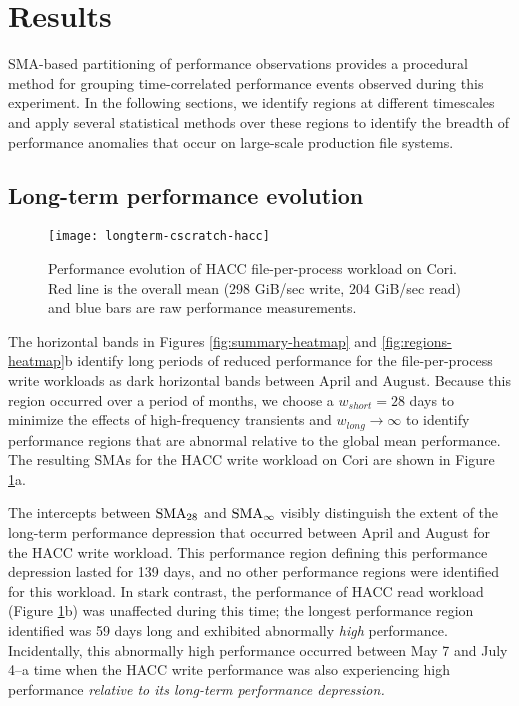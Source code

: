 \section{Results}\label{sec:results}

SMA-based partitioning of performance observations provides a procedural method for grouping time-correlated performance events observed during this experiment.
In the following sections, we identify regions at different timescales and apply several statistical methods over these regions to identify the breadth of performance anomalies that occur on large-scale production file systems.

\subsection{Long-term performance evolution} \label{sec:results/longterm}

\begin{figure}[t]
    \centering
    \texttt{[image: longterm-cscratch-hacc]}
    \vspace{-.35in}
    \caption{Performance evolution of HACC file-per-process workload on Cori.  Red line is the overall mean (298 GiB/sec write, 204 GiB/sec read) and blue bars are raw performance measurements.}
    \label{fig:timeseries-baseline}
\end{figure}

The horizontal bands in Figures \ref{fig:summary-heatmap} and \ref{fig:regions-heatmap}b identify long periods of reduced performance for the file-per-process write workloads as dark horizontal bands between April and August.
Because this region occurred over a period of months, we choose a ${w_{short}} = 28$ days to minimize the effects of high-frequency transients and ${w_{long}} \rightarrow \infty$ to identify performance regions that are abnormal relative to the global mean performance.  The resulting SMAs for the HACC write workload on Cori are shown in Figure \ref{fig:timeseries-baseline}a.

The intercepts between $\textup{SMA}_{28}$ and $\textup{SMA}_{\infty}$ visibly distinguish the extent of the long-term performance depression that occurred between April and August for the HACC write workload.
This performance region defining this performance depression lasted for 139 days, and no other performance regions were identified for this workload.
In stark contrast, the performance of HACC read workload (Figure \ref{fig:timeseries-baseline}b) was unaffected during this time; the longest performance region identified was 59 days long and exhibited abnormally \emph{high} performance.
Incidentally, this abnormally high performance occurred between May 7 and July 4--a time when the HACC write performance was also experiencing high performance \emph{relative to its long-term performance depression.}

